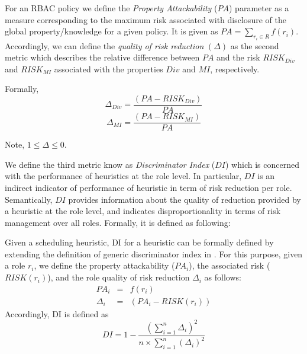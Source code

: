 For an RBAC policy we define the \textit{Property Attackability} ($PA$) parameter as a measure corresponding to the maximum  risk associated with disclosure of the global property/knowledge for a given policy. It is given as $PA = \sum_{r_i \in R} f(r_i)  $. Accordingly, we can define the \emph{quality of risk reduction} $(\Delta)$ as  the second metric which describes the  relative difference between  $PA$  and the risk $RISK_{Div}$ and $RISK_{MI}$ associated  with the properties $Div$ and $MI$, respectively. 

Formally,
\begin{equation}
\label{eq:QoR}
\Delta_{Div} = \frac{(PA - RISK_{Div})}{PA}
\end{equation}
\begin{equation}
\label{eq:QoR}
\Delta_{MI} = \frac{(PA - RISK_{MI})}{PA} 
\end{equation}

Note, $ 1 \le \Delta \le 0$.

We define the  third metric know as  \textit{Discriminator Index} ($DI$)  which is concerned with the performance of heuristics at the role level.  In particular, $DI$  is an indirect indicator of performance of heuristic in term of risk reduction per role. Semantically, $DI$ provides  information about the  quality of reduction provided by a heuristic at  the role level, and indicates disproportionality in terms of risk management over all roles. Formally, it is defined as following: 
\begin{definition}
Given a scheduling heuristic, DI for a heuristic can be formally defined by extending the definition of generic discriminator index in \cite{jain1984quantitative}. For this purpose, given a role  $r_i$, we define the property attackability ($PA_i $), the associated risk ($RISK(r_i) $), and the role quality of risk reduction $\Delta_i$ as follows:\\
\begin{eqnarray*}
PA_i &=& f(r_i)\\
\Delta_i &= &(PA_i - RISK(r_i))  
\end{eqnarray*}
Accordingly, DI is defined as 
\begin{equation}
\label{eq:DI}
 DI = 1- \frac{(\sum_{i=1}^n \Delta_i)^2}{n\times \sum_{i=1}^{n}(\Delta_i)^2} 
\end{equation}
\end{definition}


